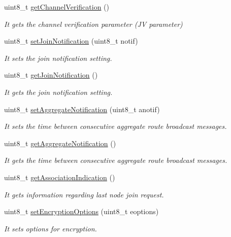 \begin{DoxyCompactItemize}
uint8\+\_\+t \hyperlink{class_wasp_x_bee_z_b_afc87e9887e21b21e166337b59c571d18}{get\+Channel\+Verification} ()
\begin{DoxyCompactList}\small\item\em It gets the channel verification parameter (JV parameter) \end{DoxyCompactList}\item 
uint8\+\_\+t \hyperlink{class_wasp_x_bee_z_b_a129227e7173f4822e9885418bd5e2a22}{set\+Join\+Notification} (uint8\+\_\+t notif)
\begin{DoxyCompactList}\small\item\em It sets the join notification setting. \end{DoxyCompactList}\item 
uint8\+\_\+t \hyperlink{class_wasp_x_bee_z_b_a598b4fc6c39c2221c2a0d507be7d24d6}{get\+Join\+Notification} ()
\begin{DoxyCompactList}\small\item\em It gets the join notification setting. \end{DoxyCompactList}\item 
uint8\+\_\+t \hyperlink{class_wasp_x_bee_z_b_a468c52498ac1f48adbb2863e868a7122}{set\+Aggregate\+Notification} (uint8\+\_\+t anotif)
\begin{DoxyCompactList}\small\item\em It sets the time between consecutive aggregate route broadcast messages. \end{DoxyCompactList}\item 
uint8\+\_\+t \hyperlink{class_wasp_x_bee_z_b_a2948d8a2278d0a9059b9f9fc835f13db}{get\+Aggregate\+Notification} ()
\begin{DoxyCompactList}\small\item\em It gets the time between consecutive aggregate route broadcast messages. \end{DoxyCompactList}\item 
uint8\+\_\+t \hyperlink{class_wasp_x_bee_z_b_a4de23b2a33913ede61d8b5170bda6842}{get\+Association\+Indication} ()
\begin{DoxyCompactList}\small\item\em It gets information regarding last node join request. \end{DoxyCompactList}\item 
uint8\+\_\+t \hyperlink{class_wasp_x_bee_z_b_aeb53beba00840257d873764dfce207a4}{set\+Encryption\+Options} (uint8\+\_\+t eoptions)
\begin{DoxyCompactList}\small\item\em It sets options for encryption. \end{DoxyCompactList}\item 

\end{DoxyCompactItemize}
